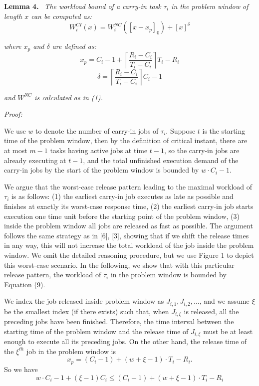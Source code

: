 \textbf{Lemma 4.} \ \textit{The workload bound of a carry-in task $\tau_i$ in the problem window of length $x$ can be computed as:}
\[
W_i^{CI}(x)=W_i^{NC}([x-x_p]_0)+[x]^\delta
\tag{9}
\]

\textit{where $x_p$ and $\delta$ are defined as:}
\[
x_p=C_i-1+\left\lceil \frac{R_i-C_i}{T_i-C_i} \right\rceil T_i-R_i
\tag{10}
\]
\[
\delta=\left\lceil \frac{R_i-C_i}{T_i-C_i} \right\rceil C_i-1
\tag{11}
\]

\textit{and $W^{NC}$ is calculated as in (1).}

\bigskip

\noindent
\textit{Proof:}

We use $w$ to denote the number of carry-in jobs of $\tau_i$. Suppose $t$ is the starting time of the problem window, then by the definition of critical instant, there are at most $m-1$ tasks having active jobs at time $t-1$, so the carry-in jobs are already executing at $t-1$, and the total unfinished execution demand of the carry-in jobs by the start of the problem window is bounded by $w\cdot C_i-1$.

We argue that the worst-case release pattern leading to the maximal workload of $\tau_i$ is as follows: (1) the earliest carry-in job executes as late as possible and finishes at exactly its worst-case response time, (2) the earliest carry-in job starts execution one time unit before the starting point of the problem window, (3) inside the problem window all jobs are released as fast as possible. The argument follows the same strategy as in [6], [3], showing that if we shift the release times in any way, this will not increase the total workload of the job inside the problem window. We omit the detailed reasoning procedure, but we use Figure 1 to depict this worst-case scenario. In the following, we show that with this particular release pattern, the workload of $\tau_i$ in the problem window is bounded by Equation (9).

We index the job released inside problem window as $J_{i,1}, J_{i,2}, \ldots$, and we assume $\xi$ be the smallest index (if there exists) such that, when $J_{i,\xi}$ is released, all the preceding jobs have been finished. Therefore, the time interval between the starting time of the problem window and the release time of $J_{i,\xi}$ must be at least enough to execute all its preceding jobs. On the other hand, the release time of the $\xi^{th}$ job in the problem window is
\[
x_p=(C_i-1)+(w+\xi-1)\cdot T_i-R_i.
\]
So we have
\[
w\cdot C_i-1+(\xi-1)C_i \leq (C_i-1)+(w+\xi-1)\cdot T_i-R_i
\]


